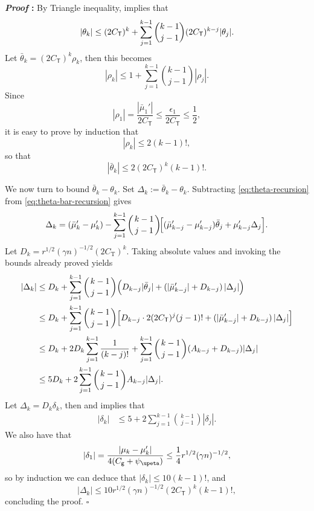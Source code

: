 \documentclass{article}
\def\eps{{\epsilon}}
\renewenvironment{proof}{\noindent\textbf{\textit{Proof }:}}{\hfill$\square$}
\begin{document}
\begin{proof}
By Triangle inequality,  implies that
\begin{equation}
    \notag
    |\theta_k| \leq (2C_{\mathsf{T}})^k + \sum_{j=1}^{k-1}\binom{k-1}{j-1}(2C_{\mathsf{T}})^{k-j} |\theta_j|.
\end{equation}
Let $\bar{\theta}_k = (2C_{\mathsf{T}})^k \rho_k$, then this becomes
\begin{equation}
    \label{eq:rho-k-recursive-general}
    |\rho_k| \leq 1 + \sum_{j=1}^{k-1}\binom{k-1}{j-1} |\rho_j|.
\end{equation}
Since 
\[
|\rho_1| = \frac{|\bar{\mu}_1'|}{2C_{\mathsf{T}}} \leq \frac{\eps_1}{2C_{\mathsf{T}}} \leq \frac{1}{2},
\]
it is easy to prove by induction that 
\[
|\rho_k| \leq 2(k-1)!,
\]
so that
\[
|\bar{\theta}_k| \leq 2(2C_{\mathsf{T}})^k(k-1)!.
\]

We now turn to bound $\bar{\theta}_k-\theta_k$.
Set $\Delta_k:=\bar\theta_k-\theta_k$.
Subtracting \eqref{eq:theta-recursion} from \eqref{eq:theta-bar-recursion} gives
\[
  \Delta_k
  =(\bar\mu_k'-\mu_k')
   -\sum_{j=1}^{k-1}\binom{k-1}{\,j-1\,}
     \!\Bigl[(\bar\mu_{k-j}'-\mu_{k-j}')\bar\theta_j
             +\mu_{k-j}'\Delta_j\Bigr].
\]
Let $D_k = r^{1/2}(\gamma n)^{-1/2}(2C_{\mathrm{T}})^k$.
Taking absolute values and invoking the bounds already proved yields
\begin{equation}\label{eq:Delta-recursion-general}
    \begin{aligned}
        |\Delta_k|
    &\le D_k
      +\sum_{j=1}^{k-1}\binom{k-1}{\,j-1\,}
        \Bigl(D_{k-j}|\bar\theta_j|
                 +(|\bar\mu_{k-j}'|+D_{k-j})\,|\Delta_j|\Bigr) \\
    &\leq D_k
      +\sum_{j=1}^{k-1}\binom{k-1}{\,j-1\,}
        \Bigl[D_{k-j}\cdot 2(2C_{\mathsf{T}})^j(j-1)!
                 +(|\bar\mu_{k-j}'|+D_{k-j})\,|\Delta_j|\Bigr] \\
    &\leq D_k
      +2D_k\sum_{j=1}^{k-1}\frac{1}{(k-j)!} + \sum_{j=1}^{k-1}\binom{k-1}{\,j-1\,} (A_{k-j}+D_{k-j})|\Delta_j| \\
      &\leq 5D_k
      + 2 \sum_{j=1}^{k-1}\binom{k-1}{\,j-1\,} A_{k-j}|\Delta_j|.
    \end{aligned}
\end{equation}
Let $\Delta_k = D_k \delta_k$, then  and  implies that
\begin{equation}
    \label{eq:delta-recursion-2}
    \begin{aligned}
        |\delta_k| &\leq 5 + 2\sum_{j=1}^{k-1}\binom{k-1}{\,j-1\,} |\delta_j|.
    \end{aligned}
\end{equation}
We also have that
\begin{equation}
    \notag
    |\delta_1| = \frac{|\mu_k-\mu_k'|}{4(C_{\mathsf{g}}+\psi_{\upeta})} \leq \frac{1}{4} r^{1/2}(\gamma n)^{-1/2},
\end{equation}
so by induction we can deduce that $|\delta_k| \leq 10(k-1)!$, and
\[
|\Delta_k| \leq 10 r^{1/2}(\gamma n)^{-1/2}(2C_{\mathsf{T}})^k(k-1)!,
\]
concluding the proof.
\end{proof}
\end{document}

